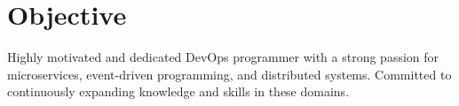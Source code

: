 \documentclass[../main.tex]{subfiles}
\begin{document}
  \section{Objective}
  \begin{category}
    \citembullet  Highly motivated and dedicated DevOps programmer with
      a strong passion for microservices, event-driven programming,
      and distributed systems. Committed to continuously expanding 
      knowledge and skills in these domains.
  \end{category}
\end{document}
